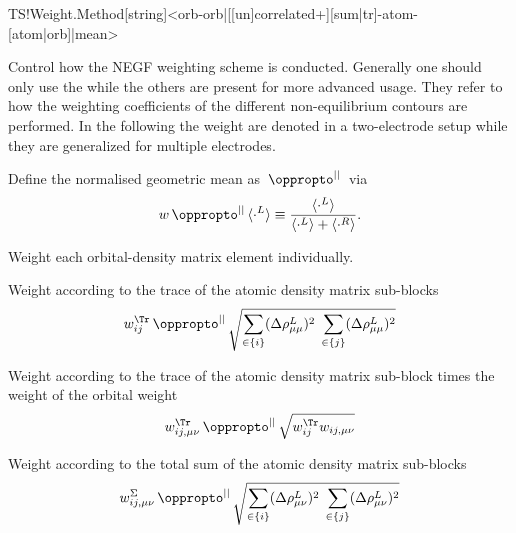 \begin{fdfentry}{TS!Weight.Method}[string]<orb-orb|[[un]correlated+][sum|tr]-atom-[atom|orb]|mean>
  
  Control how the NEGF weighting scheme is conducted. Generally one
  should only use the  while the others are present for
  more advanced usage. They refer to how the weighting coefficients of
  the different non-equilibrium contours are performed. In the
  following the weight are denoted in a two-electrode setup while they
  are generalized for multiple electrodes.

  \def\mypropto{\,\oppropto^{||}\,} %
  \def\mn{{\mu\nu}} %
  Define the normalised geometric mean as $\mypropto$ via
  \begin{equation}
    w\mypropto \langle\cdot^L\rangle\equiv
    \frac{\langle\cdot^L\rangle}{\langle\cdot^L\rangle+\langle\cdot^R\rangle}.
  \end{equation}


  \begin{fdfoptions}

    Weight each orbital-density matrix element individually.

    Weight according to the trace of the atomic density matrix sub-blocks
    \begin{equation}
      w_{ij}^{\Tr} \mypropto
      \sqrt{
          \sum_{\in\{i\}}(\Delta\rho_{\mu\mu}^L)^2
          \; %
          \sum_{\in\{j\}}(\Delta\rho_{\mu\mu}^L)^2
      }
    \end{equation}

    
    Weight according to the trace of the atomic density matrix
    sub-block times the weight of the orbital weight
    \begin{equation}
      w_{ij,\mn}^{\Tr} \mypropto
      \sqrt{
          w_{ij}^{\Tr} 
          w_{ij,\mn}
      }
    \end{equation}

    
    Weight according to the total sum of the atomic density matrix
    sub-blocks
    \begin{equation}
      w_{ij,\mn}^{\Sigma} \mypropto
      \sqrt{
          \sum_{\in\{i\}}(\Delta\rho_{\mn}^L)^2
          \; %
          \sum_{\in\{j\}}(\Delta\rho_{\mn}^L)^2
      }
    \end{equation}


\end{fdfoptions}
\end{fdfentry}
